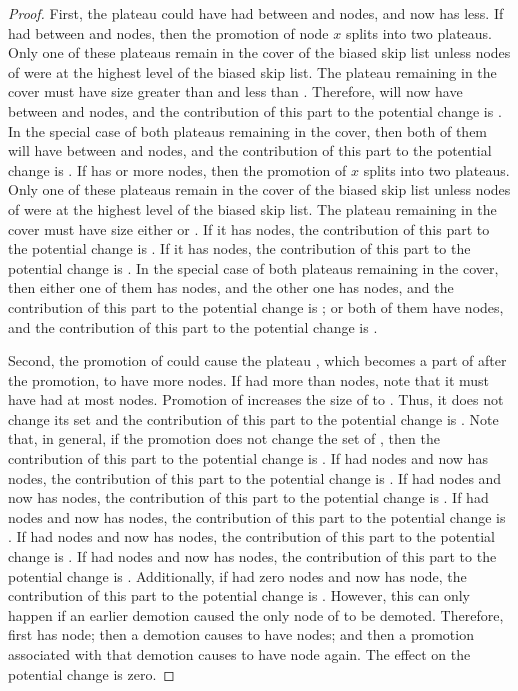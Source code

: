 \documentclass[11pt]{article}
\newcommand{\node}[1]{\ensuremath{#1}}
\newcommand{\hide}[1]{}
\begin{document}
\begin{proof}
First, the plateau  could have had between  and  nodes, and now has less. 
If  had between  and  nodes, then the promotion of node \node x splits  into two plateaus. Only one of these plateaus remain in the cover of the biased skip list unless nodes of  were at the highest level of the biased skip list. 
The plateau remaining in the cover must have size greater than  and less than . Therefore,  will now have between  and  nodes, and the contribution of this part to the potential change is . 
In the special case of both plateaus remaining in the cover, then both of them will have between  and  nodes, and the contribution of this part to the potential change is . 
If  has  or more nodes, then the promotion of \node x splits  into two plateaus. Only one of these plateaus remain in the cover of the biased skip list unless nodes of  were at the highest level of the biased skip list. 
The plateau remaining in the cover must have size either  or . 
If it has  nodes, the contribution of this part to the potential change is . 
If it has  nodes, the contribution of this part to the potential change is . 
In the special case of both plateaus remaining in the cover, then either one of them has  nodes, and the other one  has  nodes, and the contribution of this part to the potential change is ; or both of them have  nodes, and the contribution of this part to the potential change is . 


Second, the promotion of  could cause the plateau , which  becomes a part of after the promotion, to have more nodes. 
If  had more than  nodes, note that it must have had at most  nodes. Promotion of  increases the size of  to . Thus, it does not change its set and the contribution of this part to the potential change is . 
Note that, in general, if the promotion does not change the set of , then the contribution of this part to the potential change is . 
If  had\hide{between  and}  nodes and now has   nodes, the contribution of this part to the potential change is . 
If  had  nodes and now has  nodes, the contribution of this part to the potential change is . 
If  had\hide{ between  and}  nodes and now has  nodes, the contribution of this part to the potential change is . 
If  had  nodes and now has  nodes, the contribution of this part to the potential change is . 
If  had\hide{ between  and}  nodes and now has  nodes, the contribution of this part to the potential change is . 
Additionally, if  had zero nodes and now has  node, the contribution of this part to the potential change is . However, this can only happen if an earlier demotion caused the only node of  to be demoted. Therefore,  first has  node; then a demotion causes  to have  nodes; and then a promotion associated with that demotion causes  to have  node again. The effect on the potential change is zero. 


\end{proof}
\end{document}
